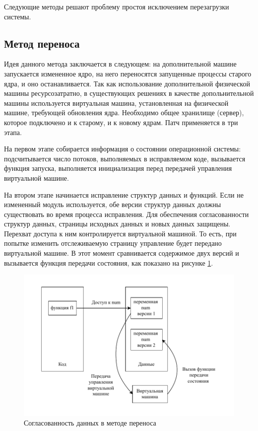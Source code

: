 Следующие методы решают проблему простоя исключением перезагрузки системы.

\subsection{Метод переноса}

Идея данного метода \cite{autopod} заключается в следующем: на дополнительной машине запускается измененное ядро, на него переносятся запущенные процессы старого ядра, и оно останавливается. Так как использование дополнительной физической машины ресурсозатратно, в существующих решениях \cite{lucos} в качестве допольнительной машины используется виртуальная машина, установленная на физической машине, требующей обновления ядра. Необходимо общее хранилище (сервер), которое подключено и к старому, и к новому ядрам. Патч применяется в три этапа.

На первом этапе собирается информация о состоянии операционной системы: подсчитывается число потоков, выполняемых в исправляемом коде, вызывается функция запуска, выполняется инициализация перед передачей управления виртуальной машине.

На втором этапе начинается исправление структур данных и функций. Если не измененный модуль используется, обе версии структур данных должны существовать во время процесса исправления. Для обеспечения согласованности структур данных, страницы исходных данных и новых данных защищены. Перехват доступа к ним контролируется виртуальной машиной. То есть, при попытке изменить отслеживаемую страницу управление будет передано виртуальной машине. В этот момент сравнивается содержимое двух версий и вызывается функция передачи состояния, как показано на рисунке \ref{img:vm}.

\begin{figure}[H]
	\begin{center}
		\includegraphics[scale=0.8]{img/vm.pdf}
	\end{center}
	\captionsetup{justification=centering}
	\caption{Согласованность данных в методе переноса}
	\label{img:vm}
\end{figure}


